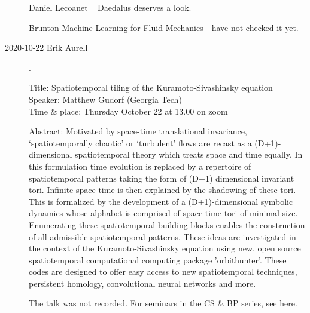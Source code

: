 \begin{description}
{Daniel Lecoanet \etal\ 
{Daedalus} deserves a look.

Brunton \etal {}
{Machine Learning for Fluid Mechanics} - have not checked it yet.
    }

\item[2020-10-22 Erik Aurell].

Title: Spatiotemporal tiling of the Kuramoto-Sivashinsky equation
\\
Speaker: Matthew Gudorf (Georgia Tech)
\\
Time \& place: Thursday October 22 at 13.00 on zoom

Abstract:
Motivated by space-time translational invariance, `spatiotemporally
chaotic' or `turbulent' flows are recast as a (D+1)-dimensional
spatiotemporal theory which treats space and time equally. In this
formulation time evolution is replaced by a repertoire of spatiotemporal
patterns taking the form of (D+1) dimensional invariant tori. Infinite
space-time is then explained by the shadowing of these tori. This is
formalized by the development of a (D+1)-dimensional symbolic dynamics
whose alphabet is comprised of space-time tori of minimal size.
Enumerating these spatiotemporal building blocks enables the construction
of all admissible spatiotemporal patterns. These ideas are investigated
in the context of the Kuramoto-Sivashinsky equation using new, open
source spatiotemporal computational computing package 'orbithunter'.
These codes are designed to offer easy access to new spatiotemporal
techniques, persistent homology, convolutional neural networks and more.

The talk was not recorded.
For seminars in the CS \& BP series, see
 {here}.



\end{description}
